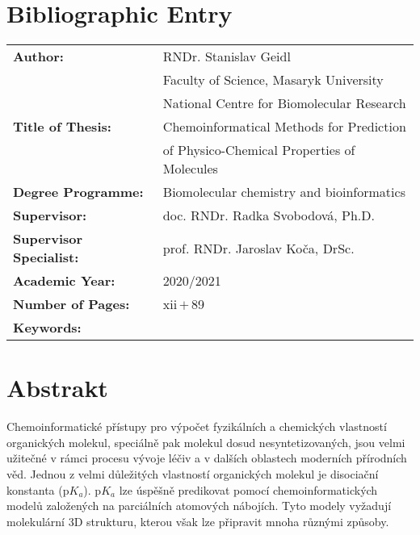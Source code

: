\documentclass[11pt,b5paper,oneside,final]{book}
\begin{document}
\vfill
\section*{Bibliographic Entry}
\def\arraystretch{1.5}
\begin{tabular}{ lp{7.5cm} } 
  \textbf{Author:}                & RNDr. Stanislav Geidl \\
                                  & Faculty of Science, Masaryk University \\
                                  & National Centre for Biomolecular Research \\
  \textbf{Title of Thesis:}       & Chemoinformatical Methods for Prediction \\
                                  & of Physico-Chemical Properties of Molecules \\ 
  \textbf{Degree Programme:}      & Biomolecular chemistry and bioinformatics \\
  \textbf{Supervisor:}            & doc. RNDr. Radka Svobodová, Ph.D. \\
  \textbf{Supervisor Specialist:} & prof. RNDr. Jaroslav Koča, DrSc. \\
  \textbf{Academic Year:}         & 2020/2021 \\
  \textbf{Number of Pages:}       & xii\,$+$\,89\\
  \textbf{Keywords:}              &  \\
\end{tabular}
\clearpage

\pagestyle{plain}

\section*{Abstrakt}
Chemoinformatické přístupy pro výpočet fyzikálních a chemických vlastností
organických molekul, speciálně pak molekul dosud nesyntetizovaných, jsou vel\-mi
užitečné v rámci procesu vývoje léčiv a v dalších oblastech moderních pří\-ro\-dních
věd. Jednou z velmi důležitých vlastností organických molekul je disociační
konstanta (p$K_a$). p$K_a$ lze úspěšně predikovat pomocí chemoinformatických
modelů založených na parciálních atomových nábojích. Tyto modely vyžadují
molekulární 3D strukturu, kterou však lze připravit mnoha různými způsoby.
\end{document}
